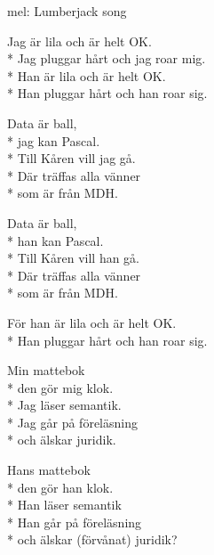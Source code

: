 \begin{SongText}
    \begin{SongInfo}
        mel: Lumberjack song
    \end{SongInfo}
    \begin{SongVerse}
        Jag är lila och är helt OK.\\*%
        Jag pluggar hårt och jag roar mig.\\*%
        Han är lila och är helt OK.\\*%
        Han pluggar hårt och han roar sig.
    \end{SongVerse}
    \begin{SongVerse}
        Data är ball,\\*%
        jag kan Pascal.\\*%
        Till Kåren vill jag gå.\\*%
        Där träffas alla vänner\\*%
        som är från MDH.
    \end{SongVerse}
    \begin{SongVerse}
        Data är ball,\\*%
        han kan Pascal.\\*%
        Till Kåren vill han gå.\\*%
        Där träffas alla vänner\\*%
        som är från MDH.
    \end{SongVerse}
    \begin{SongVerse}
        För han är lila och är helt OK.\\*%
        Han pluggar hårt och han roar sig.
    \end{SongVerse}
    \begin{SongVerse}
        Min mattebok\\*%
        den gör mig klok.\\*%
        Jag läser semantik.\\*%
        Jag går på föreläsning\\*%
        och älskar juridik.
    \end{SongVerse}
    \begin{SongVerse}
        Hans mattebok\\*%
        den gör han klok.\\*%
        Han läser semantik\\*%
        Han går på föreläsning\\*%
        och älskar (förvånat) juridik?
    \end{SongVerse}

\end{SongText}
